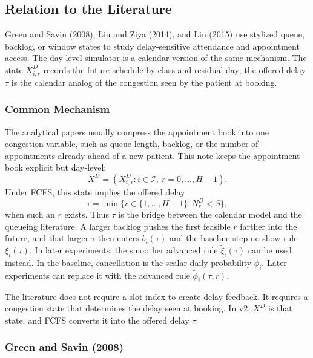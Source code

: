 \documentclass[11pt]{article}
\begin{document}
\subsection{Relation to the Literature}

Green and Savin (2008), Liu and Ziya (2014), and Liu (2015) use stylized queue, backlog, or window
states to study delay-sensitive attendance and appointment access. The day-level simulator is a
calendar version of the same mechanism. The state \(X_{i,r}^{D}\) records the future schedule by
class and residual day; the offered delay \(\tau\) is the calendar analog of the congestion seen by
the patient at booking.

\subsubsection{Common Mechanism}

The analytical papers usually compress the appointment book into one congestion variable, such as
queue length, backlog, or the number of appointments already ahead of a new patient. This note keeps
the appointment book explicit but day-level:
\[
X^D=\left(X_{i,r}^{D}:i\in\mathcal I,\ r=0,\dots,H-1\right).
\]
Under FCFS, this state implies the offered delay
\[
\tau
=
\min\{r\in\{1,\dots,H-1\}:N_r^D<S\},
\]
when such an \(r\) exists. Thus \(\tau\) is the bridge between the calendar model and the queueing
literature. A larger backlog pushes the first feasible \(r\) farther into the future, and that
larger \(\tau\) then enters \(b_i(\tau)\) and the baseline step no-show rule \(\xi_i(\tau)\). In
later experiments, the smoother advanced rule \(\tilde{\xi}_i(\tau)\) can be used instead. In the
baseline, cancellation is the scalar daily probability \(\phi_i\). Later experiments can replace it
with the advanced rule \(\tilde{\phi}_i(\tau,r)\).

\begin{keybox}[title={Why the Day-Level Model Still Matches the Literature}]
The literature does not require a slot index to create delay feedback. It requires a congestion
state that determines the delay seen at booking. In v2, \(X^D\) is that state, and FCFS converts it
into the offered delay \(\tau\).
\end{keybox}

\subsubsection{Green and Savin (2008)}
\end{document}
